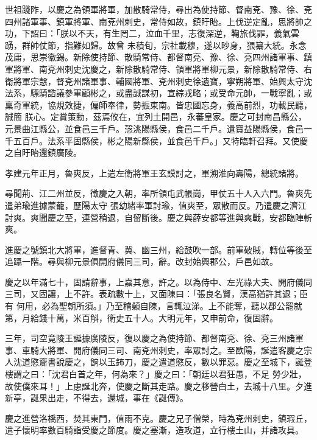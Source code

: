 \begin{pinyinscope}
 世祖踐阼，以慶之為領軍將軍，加散騎常侍，尋出為使持節、督南兗、豫、徐、兗四州諸軍事、鎮軍將軍、南兗州刺史，常侍如故，鎮盱眙。上伐逆定亂，思將帥之功，下詔曰：「朕以不天，有生罔二，泣血千里，志復深逆，鞠旅伐罪，義氣雲踴，群帥仗節，指難如歸。故曾
 未積旬，宗社載穆，遂以眇身，猥纂大統。永念茂庸，思崇徽錫。新除使持節、散騎常侍、都督南兗、豫、徐、兗四州諸軍事、鎮軍將軍、南兗州刺史沈慶之，新除散騎常侍、領軍將軍柳元景，新除散騎常侍、右衛將軍宗愨，督兗州諸軍事、輔國將軍、兗州刺史徐遺寶，寧朔將軍、始興太守沈法系，驃騎諮議參軍顧彬之，或盡誠謀初，宣綜戎略；或受命元帥，一戰寧亂；或稟奇軍統，協規效捷，偏師奉律，勢振東南。皆忠國忘身，義高前烈，功載民聽，誠簡
 朕心。定賞策勳，茲焉攸在，宜列土開邑，永蕃皇家。慶之可封南昌縣公，元景曲江縣公，並食邑三千戶。愨洮陽縣侯，食邑二千戶。遺寶益陽縣侯，食邑一千五百戶。法系平固縣侯，彬之陽新縣侯，並食邑千戶。」又特臨軒召拜。又使慶之自盱眙還鎮廣陵。



 孝建元年正月，魯爽反，上遣左衛將軍王玄謨討之，軍溯淮向壽陽，總統諸將。



 尋聞荊、江二州並反，徵慶之入朝，率所領屯武帳崗，甲仗五十人入六門。魯爽先遣弟瑜進據蒙蘢，歷陽太守
 張幼緒率軍討瑜，值爽至，眾散而反。乃遣慶之濟江討爽。爽聞慶之至，連營稍退，自留斷後。慶之與薛安都等進與爽戰，安都臨陣斬爽。



 進慶之號鎮北大將軍，進督青、冀、幽三州，給鼓吹一部。前軍破賊，轉位等後至追躡一階。尋與柳元景俱開府儀同三司，辭。改封始興郡公，戶邑如故。



 慶之以年滿七十，固請辭事，上嘉其意，許之。以為侍中、左光祿大夫、開府儀同三司，又固讓，上不許。表疏數十上，又面陳曰：「張良名賢，漢高猶許其退；臣有
 何用，必為聖朝所須。」乃至稽顙自陳，言輒泣涕。上不能奪，聽以郡公罷就第，月給錢十萬，米百斛，衛史五十人。大明元年，又申前命，復固辭。



 三年，司空竟陵王誕據廣陵反，復以慶之為使持節、都督南兗、徐、兗三州諸軍事、車騎大將軍、開府儀同三司、南兗州刺史，率眾討之。至歐陽，誕遣客慶之宗人沈道愍齎書說慶之，餉以玉鈽刀，慶之遣道愍反，數以罪惡。慶之至城下，誕登樓謂之曰：「沈君白首之年，何為來？」慶之曰：「朝廷以君狂愚，不足
 勞少壯，故使僕來耳！」上慮誕北奔，使慶之斷其走路。慶之移營白土，去城十八里。夕進新亭，誕果出走，不得去，還城，事在《誕傳》。



 慶之進營洛橋西，焚其東門，值雨不克。慶之兄子僧榮，時為兗州刺史，鎮瑕丘，遣子懷明率數百騎詣受慶之節度。慶之塞漸，造攻道，立行樓土山，并諸攻具。




\end{pinyinscope}
